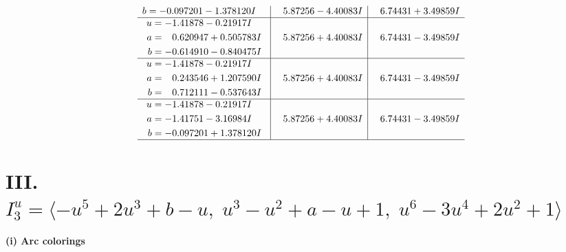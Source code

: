 \documentclass[1p]{elsarticle_modified}
\theoremstyle{definition}
\begin{document}
$$\begin{array}{c|c|c}
\begin{aligned}
b &= -0.097201 - 1.378120 I\end{aligned}
 & \phantom{-}5.87256 - 4.40083 I & \phantom{-}6.74431 + 3.49859 I \\ \hline\begin{aligned}
u &= -1.41878 - 0.21917 I \\
a &= \phantom{-}0.620947 + 0.505783 I \\
b &= -0.614910 - 0.840475 I\end{aligned}
 & \phantom{-}5.87256 + 4.40083 I & \phantom{-}6.74431 - 3.49859 I \\ \hline\begin{aligned}
u &= -1.41878 - 0.21917 I \\
a &= \phantom{-}0.243546 + 1.207590 I \\
b &= \phantom{-}0.712111 - 0.537643 I\end{aligned}
 & \phantom{-}5.87256 + 4.40083 I & \phantom{-}6.74431 - 3.49859 I \\ \hline\begin{aligned}
u &= -1.41878 - 0.21917 I \\
a &= -1.41751 - 3.16984 I \\
b &= -0.097201 + 1.378120 I\end{aligned}
 & \phantom{-}5.87256 + 4.40083 I & \phantom{-}6.74431 - 3.49859 I\\
 \hline 
 \end{array}$$\newpage\newpage\renewcommand{\arraystretch}{1}
\centering \section*{III. $I^u_{3}= \langle - u^5+2 u^3+b- u,\;u^3- u^2+a- u+1,\;u^6-3 u^4+2 u^2+1 \rangle$}
\flushleft \textbf{(i) Arc colorings}\\
\end{document}
